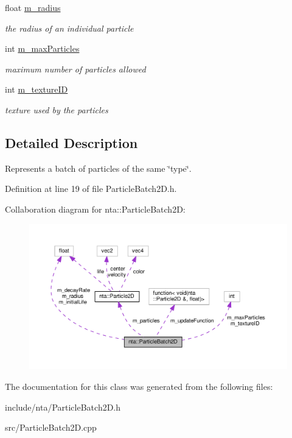\begin{DoxyCompactItemize}
float \hyperlink{classnta_1_1ParticleBatch2D_ac564b88da2f73d5692cbdec15478fe4d}{m\+\_\+radius}
\begin{DoxyCompactList}\small\item\em the radius of an individual particle \end{DoxyCompactList}\item 
\mbox{\label{classnta_1_1ParticleBatch2D_acf0dbc3bae31f962ed403daf06848948}} 
int \hyperlink{classnta_1_1ParticleBatch2D_acf0dbc3bae31f962ed403daf06848948}{m\+\_\+max\+Particles}
\begin{DoxyCompactList}\small\item\em maximum number of particles allowed \end{DoxyCompactList}\item 
\mbox{\label{classnta_1_1ParticleBatch2D_a73232a0481db52884b42c50deb456add}} 
int \hyperlink{classnta_1_1ParticleBatch2D_a73232a0481db52884b42c50deb456add}{m\+\_\+texture\+ID}
\begin{DoxyCompactList}\small\item\em texture used by the particles \end{DoxyCompactList}\end{DoxyCompactItemize}


\subsection{Detailed Description}
Represents a batch of particles of the same \char`\"{}type\char`\"{}. 

Definition at line 19 of file Particle\+Batch2\+D.\+h.



Collaboration diagram for nta\+:\+:Particle\+Batch2D\+:\nopagebreak
\begin{figure}[H]
\begin{center}
\leavevmode
\includegraphics[width=350pt]{d4/d22/classnta_1_1ParticleBatch2D__coll__graph}
\end{center}
\end{figure}


The documentation for this class was generated from the following files\+:\begin{DoxyCompactItemize}
\item 
include/nta/Particle\+Batch2\+D.\+h\item 
src/Particle\+Batch2\+D.\+cpp\end{DoxyCompactItemize}
